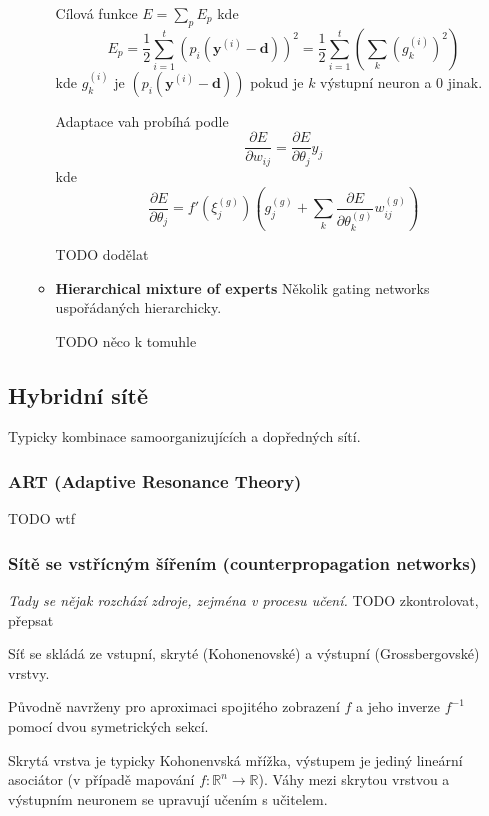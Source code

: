 \documentclass[11pt]{report} %
\newcommand{\R}{\mathbb{R}}
\renewcommand{\vec}[1]{\mathbf{#1}}
\numberwithin{equation}{section}
\begin{document}
\begin{itemize}
\begin{itemize}
		Cílová funkce $E = \sum_p E_p$ kde
		$$E_p = \frac{1}{2}\sum_{i=1}^{t}(p_i(\vec{y}^{(i)}-\vec{d}))^2 = \frac{1}{2}\sum_{i=1}^{t}\left(\sum_{k} (g_k^{(i)})^2 \right)$$
		kde $g_k^{(i)}$ je $(p_i(\vec{y}^{(i)}-\vec{d}))$ pokud je $k$ výstupní neuron a 0 jinak.
		
		Adaptace vah probíhá podle 
		$$\frac{\partial E}{\partial w_{ij}} = \frac{\partial E}{\partial \theta_j}y_j$$
		kde 
		$$\frac{\partial E}{\partial \theta_j} = f'(\xi_j^{(g)})\left(g_j^{(g)} + \sum_{k} \frac{\partial E}{\partial \theta_k^{(g)}} w_{ij}^{(g)} \right)$$
		
		
		TODO dodělat
		
		\item \textbf{Hierarchical mixture of experts} Několik gating networks uspořádaných hierarchicky.
		
		TODO něco k tomuhle
	\end{itemize}
	
\end{itemize}





\subsection{Hybridní sítě}
Typicky kombinace samoorganizujících a dopředných sítí.

\subsubsection{ART (Adaptive Resonance Theory)}

TODO wtf

\subsubsection{Sítě se vstřícným šířením (counterpropagation networks)}
\textit{Tady se nějak rozchází zdroje, zejména v procesu učení.} TODO zkontrolovat, přepsat

Síť se skládá ze vstupní, skryté (Kohonenovské) a výstupní (Grossbergovské) vrstvy.

Původně navrženy pro aproximaci spojitého zobrazení $f$ a jeho inverze $f^{-1}$ pomocí dvou symetrických sekcí.

Skrytá vrstva je typicky Kohonenvská mřížka, výstupem je jediný lineární asociátor (v případě mapování $f : \R^n \to \R$). Váhy mezi skrytou vrstvou a výstupním neuronem se upravují učením s učitelem.
\end{document}
